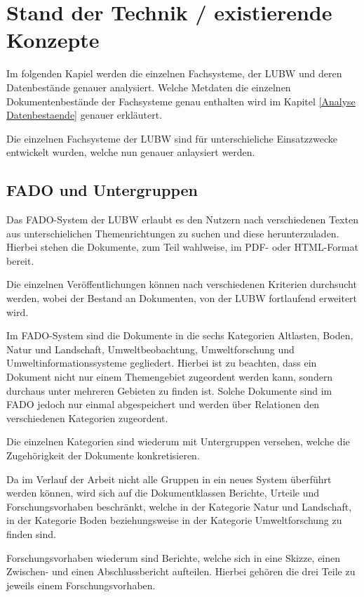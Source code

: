 \section{Stand der Technik / existierende Konzepte} \label{Stand der Technik}
Im folgenden Kapiel werden die einzelnen Fachsysteme, der \ac{LUBW} und deren Datenbest\"ande genauer analysiert. Welche Metdaten die einzelnen Dokumentenbest\"ande der Fachsysteme genau enthalten wird im Kapitel \ref{Analyse Datenbestaende} genauer erkl\"autert. 

Die einzelnen Fachsysteme der \ac{LUBW} sind f\"ur unterschieliche Einsatzzwecke entwickelt wurden, welche nun genauer anlaysiert werden.

\subsection{FADO und Untergruppen} \label{FADO}
Das \ac{FADO}-System der \ac{LUBW} erlaubt es den Nutzern nach verschiedenen Texten aus unterschielichen Themenrichtungen zu suchen und diese herunterzuladen. Hierbei stehen die Dokumente, zum Teil wahlweise, im PDF- oder HTML-Format bereit.

Die einzelnen Ver\"offentlichungen k\"onnen nach verschiedenen Kriterien durchsucht werden, wobei der Bestand an Dokumenten, von der \ac{LUBW} fortlaufend erweitert wird.
\cite{LUBW_FADO}

Im \ac{FADO}-System sind die Dokumente in die sechs Kategorien Altlasten, Boden, Natur und Landschaft, Umweltbeobachtung, Umweltforschung und Umweltinformationssysteme gegliedert. Hierbei ist zu beachten, dass ein Dokument nicht nur einem Themengebiet zugeordent werden kann, sondern durchaus unter mehreren Gebieten zu finden ist. Solche Dokumente sind im \ac{FADO} jedoch nur einmal abgespeichert und werden \"uber Relationen den verschiedenen Kategorien zugeordent.

Die einzelnen Kategorien sind wiederum mit Untergruppen versehen, welche die Zugeh\"origkeit der Dokumente konkretisieren.

Da im Verlauf der Arbeit nicht alle Gruppen in ein neues System \"uberf\"uhrt werden k\"onnen, wird sich auf die Dokumentklassen Berichte, Urteile und Forschungsvorhaben beschr\"ankt, welche in der Kategorie Natur und Landschaft, in der Kategorie Boden beziehungsweise in der Kategorie Umweltforschung zu finden sind.

Forschungsvorhaben wiederum sind Berichte, welche sich in eine Skizze, einen Zwischen- und einen Abschlussbericht aufteilen. Hierbei geh\"oren die drei Teile zu jeweils einem Forschungsvorhaben.

